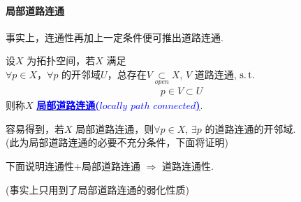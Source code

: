 \newpage
\paragraph{局部道路连通}
	事实上，连通性再加上一定条件便可推出道路连通.
	\begin{defn}\label{def 2.3.7}
		设$X$ 为拓扑空间，若$X$ 满足\\
		$\forall p \in X$，$\forall p$ 的开邻域$U$，总存在$V \underset{open}{\subset} X$, $V$ 道路连通, $\operatorname{s.t.}$
		\begin{align}
			p \in V \subset U
		\end{align}
		则称$X$ \underline{\textcolor{blue}{\textbf{局部道路连通($locally \,\, path \,\, connected$)}}}.
		
		\begin{rmk}
			容易得到，若$X$ 局部道路连通，则$\forall p \in X$, $\exists p$ 的道路连通的开邻域.\\
			(此为局部道路连通的必要不充分条件，下面将证明)
		\end{rmk}
	\end{defn}

	\vspace{2em}
	下面说明连通性+局部道路连通 $\Rightarrow$ 道路连通性.
	\begin{center}
		(事实上只用到了局部道路连通的弱化性质)
	\end{center}
	
